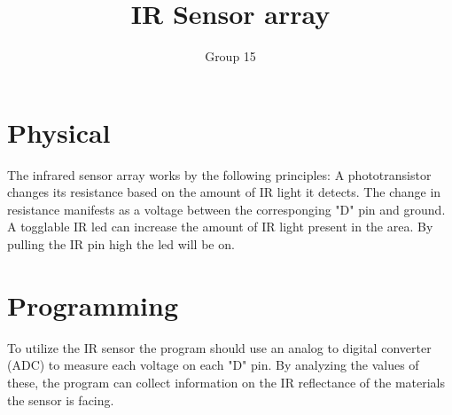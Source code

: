 \documentclass{article}
\title{IR Sensor array}
\author{Group 15}
\begin{document}
\section{Physical}

    The infrared sensor array works by the following principles:
    A phototransistor changes its resistance based on the amount of IR light it detects.
    The change in resistance manifests as a voltage between the corresponging "D" pin and ground.
    A togglable IR led can increase the amount of IR light present in the area. By pulling the IR
    pin high the led will be on.

\section{Programming}

    To utilize the IR sensor the program should use an analog to digital converter (ADC) to measure
    each voltage on each "D" pin. By analyzing the values of these, the program can collect information
    on the IR reflectance of the materials the sensor is facing.
\end{document}
